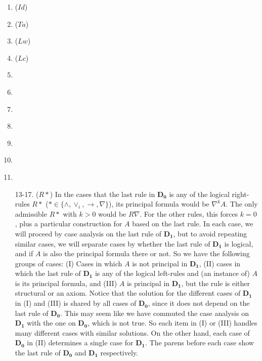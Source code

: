 \documentclass[a4paper, 12pt]{paper}
\begin{document}
\begin{enumerate}
	\item ($Id$) \label{c:id-*} 

	\item ($Ta$) \label{c:ta-*} 

	\item ($Lw$) \label{c:lw-*} 

	\item ($Lc$) \label{c:lc-*} 

	\item \label{c:cut-*} 

	\item \label{c:la1-*} 

	\item \label{c:la2-*} 
	
	\item \label{c:lo-*} 
	
	\item \label{c:ln-*} 
	
	\item \label{c:li-*} 
	
	\item \label{c:rw-*} 


	\item[13-17.] ($R*$) In the cases that the last rule in $\mathbf{D_0}$ is any of the logical right-rules $R*$ ($* \in \{ \land, \lor_{i}, \rightarrow, \nabla \}$), its principal formula would be $\nabla^k A$. The only admissible $R*$ with $k > 0$ would be $R\nabla$. For the other rules, this forces $k = 0$, plus a particular construction for $A$ based on the last rule. In each case, we will proceed by case analysis on the last rule of $\mathbf{D_1}$, but to avoid repeating similar cases, we will separate cases by whether the last rule of $\mathbf{D_1}$ is logical, and if $A$ is also the principal formula there or not. So we have the following groups of cases:
	(I) Cases in which $A$ is not principal in $\mathbf{D_1}$,
	(II) cases in which the last rule of $\mathbf{D_1}$ is any of the logical left-rules and (an instance of) $A$ is its principal formula, and (III) $A$ is principal in $\mathbf{D_1}$, but the rule is either structural or an axiom. Notice that the solution for the different cases of $\mathbf{D_1}$ in (I) and (III) is shared by all cases of $\mathbf{D_0}$, since it does not depend on the last rule of $\mathbf{D_0}$. This may seem like we have commuted the case analysis on $\mathbf{D_1}$ with the one on $\mathbf{D_0}$, which is not true. So each item in (I) or (III) handles many different cases with similar solutions.
	On the other hand, each case of $\mathbf{D_0}$ in (II) determines a single case for $\mathbf{D_1}$. The parens before each case show the last rule of $\mathbf{D_0}$ and $\mathbf{D_1}$ respectively.


\end{enumerate}
\end{document}
